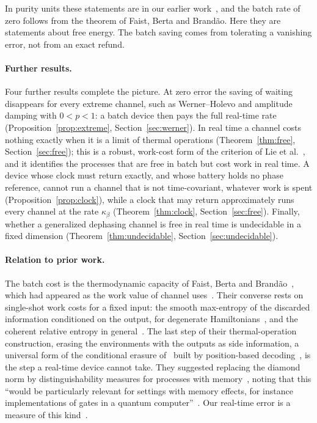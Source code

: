 \documentclass[11pt]{article}
\theoremstyle{definition}
\theoremstyle{remark}
\newcommand{\Trt}{\kappa_\beta}
\begin{document}
In purity units these statements are in our earlier work~\cite{ImmediateDelivery}, and the batch rate of zero follows from the theorem of Faist, Berta and Brand\~ao. Here they are statements about free energy. The batch saving comes from tolerating a vanishing error, not from an exact refund.

\paragraph{Further results.} Four further results complete the picture. At zero error the saving of waiting disappears for every extreme channel, such as Werner--Holevo and amplitude damping with $0<p<1$: a batch device then pays the full real-time rate (Proposition~\ref{prop:extreme}, Section~\ref{sec:werner}). In real time a channel costs nothing exactly when it is a limit of thermal operations (Theorem~\ref{thm:free}, Section~\ref{sec:free}); this is a robust, work-cost form of the criterion of Lie et al.~\cite{LieEtAl26}, and it identifies the processes that are free in batch but cost work in real time. A device whose clock must return exactly, and whose battery holds no phase reference, cannot run a channel that is not time-covariant, whatever work is spent (Proposition~\ref{prop:clock}), while a clock that may return approximately runs every channel at the rate $\Trt$ (Theorem~\ref{thm:clock}, Section~\ref{sec:free}). Finally, whether a generalized dephasing channel is free in real time is undecidable in a fixed dimension (Theorem~\ref{thm:undecidable}, Section~\ref{sec:undecidable}).

\paragraph{Relation to prior work.} The batch cost is the thermodynamic capacity of Faist, Berta and Brand\~ao~\cite{FBB19,FBB21}, which had appeared as the work value of channel uses~\cite{NGP15}. Their converse rests on single-shot work costs for a fixed input: the smooth max-entropy of the discarded information conditioned on the output, for degenerate Hamiltonians~\cite{FDOR15}, and the coherent relative entropy in general~\cite{FR18}. The last step of their thermal-operation construction, erasing the environments with the outputs as side information, a universal form of the conditional erasure of~\cite{delRio11} built by position-based decoding~\cite[Sec.~7]{FBB21}, is the step a real-time device cannot take. They suggested replacing the diamond norm by distinguishability measures for processes with memory~\cite{Chiribella08}, noting that this ``would be particularly relevant for settings with memory effects, for instance implementations of gates in a quantum computer''~\cite{FBB19}. Our real-time error is a measure of this kind~\cite{Chiribella08,GutoskiWatrous07}.
\end{document}
